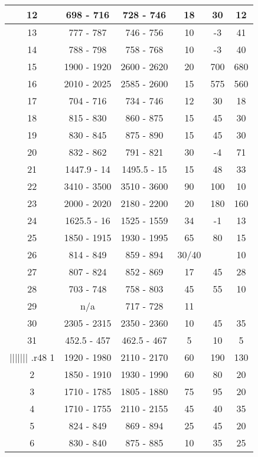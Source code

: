 \begin{table}[]
\begin{tabular}{|c|c|c|c|c|c|}
    12 & 698 - 716   & 728 - 746   & 18 & 30  & 12  \\ \hline
    13 & 777 - 787   & 746 - 756   & 10 & -3  & 41  \\ \hline
    14 & 788 - 798   & 758 - 768   & 10 & -3  & 40  \\ \hline
    15 & 1900 - 1920 & 2600 - 2620 & 20 & 700  & 680  \\ \hline
    16 & 2010 - 2025 & 2585 - 2600 & 15 & 575 & 560 \\ \hline
    17 & 704 - 716   & 734 - 746   & 12 & 30  & 18  \\ \hline
    18 & 815 - 830   & 860 - 875   & 15 & 45  & 30  \\ \hline
    19 & 830 - 845   & 875 - 890   & 15 & 45  & 30  \\ \hline
    20 & 832 - 862   & 791 - 821   & 30 & -4  & 71  \\ \hline
    21 & 1447.9 - 14 & 1495.5 - 15 & 15 & 48  & 33  \\ \hline
    22 & 3410 - 3500 & 3510 - 3600 & 90 & 100  & 10  \\ \hline
    23 & 2000 - 2020 & 2180 - 2200 & 20 & 180  & 160  \\ \hline
    24 & 1625.5 - 16 & 1525 - 1559 & 34 & -1  & 13  \\ \hline
    25 & 1850 - 1915 & 1930 - 1995 & 65 & 80  & 15  \\ \hline
    26 & 814 - 849   & 859 - 894   & 30/40 &     & 10  \\ \hline
    27 & 807 - 824   & 852 - 869   & 17 & 45  & 28  \\ \hline
    28 & 703 - 748   & 758 - 803   & 45 & 55  & 10  \\ \hline
    29 & n/a         & 717 - 728   & 11 &     &     \\ \hline
    30 & 2305 - 2315 & 2350 - 2360 & 10 & 45  & 35  \\ \hline
    31 & 452.5 - 457 & 462.5 - 467 & 5  & 10  & 5   \\ \hline
||||||| .r48
    1  & 1920 - 1980 & 2110 - 2170 & 60 & 190 & 130 \\ \hline
    2  & 1850 - 1910 & 1930 - 1990 & 60 & 80  & 20  \\ \hline
    3  & 1710 - 1785 & 1805 - 1880 & 75 & 95  & 20  \\ \hline
    4  & 1710 - 1755 & 2110 - 2155 & 45 & 40  & 35  \\ \hline
    5  & 824 - 849   & 869 - 894   & 25 & 45  & 20  \\ \hline
    6  & 830 - 840   & 875 - 885   & 10 & 35  & 25  \\ \hline

\end{tabular}
\end{table}
